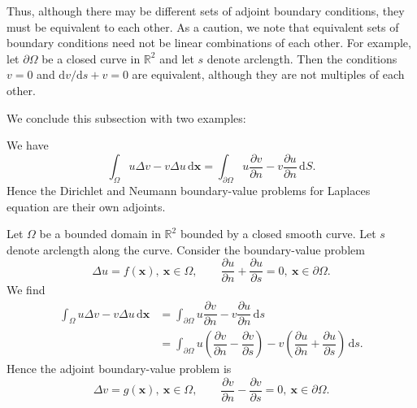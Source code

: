 Thus, although there may be different sets of adjoint boundary conditions, they must be equivalent to each other. As a caution, we note that equivalent sets of boundary conditions need not be linear combinations of each other. For example, let $\partial\Omega$ be a closed curve in $\mathbb{R}^2$ and let $s$ denote arclength. Then the conditions $v=0$ and $\mathrm{d}v/\mathrm{d}s+v=0$ are equivalent, although they are not multiples of each other.

We conclude this subsection with two examples:

\begin{Example}
\label{ex:laplace-dirichlet-neumann-self-adjoint}
We have
\begin{equation}\label{eq:laplace-dirichlet-neumann-green-identity}
\int_\Omega u\Delta v-v\Delta u\,\mathrm{d}\bm{x}=\int_{\partial\Omega}u\dfrac{\partial v}{\partial n}-v\dfrac{\partial u}{\partial n}\,\mathrm{d}S.
\end{equation}
Hence the Dirichlet and Neumann boundary-value problems for Laplace\textquotesingle s equation are their own adjoints.
\end{Example}

\begin{Example}
\label{ex:normal-tangential-adjoint-boundary-problem}
Let $\Omega$ be a bounded domain in $\mathbb{R}^2$ bounded by a closed smooth curve. Let $s$ denote arclength along the curve. Consider the boundary-value problem
\begin{equation}\label{eq:laplace-normal-tangential-boundary-problem}
\Delta u=f(\bm{x}),\ \bm{x}\in\Omega,\qquad\dfrac{\partial u}{\partial n}+\dfrac{\partial u}{\partial s}=0,\ \bm{x}\in\partial\Omega.
\end{equation}
We find
\begin{equation}\label{eq:laplace-normal-tangential-adjoint-calculation}
\begin{aligned}
\int_\Omega u\Delta v-v\Delta u\,\mathrm{d}\bm{x}
&=\int_{\partial\Omega}u\dfrac{\partial v}{\partial n}-v\dfrac{\partial u}{\partial n}\,\mathrm{d}s\\
&=\int_{\partial\Omega}u\left(\dfrac{\partial v}{\partial n}-\dfrac{\partial v}{\partial s}\right)
-v\left(\dfrac{\partial u}{\partial n}+\dfrac{\partial u}{\partial s}\right)\,\mathrm{d}s.
\end{aligned}
\end{equation}
Hence the adjoint boundary-value problem is
\begin{equation}\label{eq:laplace-normal-tangential-adjoint-problem}
\Delta v=g(\bm{x}),\ \bm{x}\in\Omega,\qquad\dfrac{\partial v}{\partial n}-\dfrac{\partial v}{\partial s}=0,\ \bm{x}\in\partial\Omega.
\end{equation}

\end{Example}
